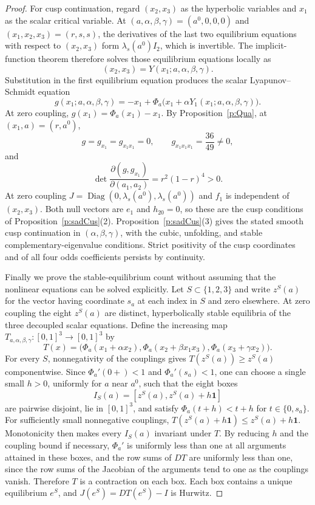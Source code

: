 \begin{proof}
For cusp continuation, regard $(x_2,x_3)$ as the
hyperbolic variables and $x_1$ as the scalar critical
variable. At $(a,\alpha,\beta,\gamma)=(a^0,0,0,0)$
and $(x_1,x_2,x_3)=(r,s,s)$, the derivatives of the last
two equilibrium equations with respect to $(x_2,x_3)$
form $\lambda_s(a^0)I_2$, which is invertible.
The implicit-function theorem therefore solves those
equilibrium equations locally as
\[
 (x_2,x_3)=Y(x_1;a,\alpha,\beta,\gamma).
\]
Substitution in the first equilibrium equation produces
the scalar Lyapunov--Schmidt equation
\[
 g(x_1;a,\alpha,\beta,\gamma)
 =-x_1+\Phi_a\bigl(x_1+\alpha Y_1(x_1;a,\alpha,\beta,\gamma)\bigr).
\]
At zero coupling, $g(x_1)=\Phi_a(x_1)-x_1$. By
Proposition~\ref{p:Qua}, at $(x_1,a)=(r,a^0)$,
\[
 g=g_{x_1}=g_{x_1x_1}=0,\qquad
 g_{x_1x_1x_1}=\frac{36}{49}\ne0,
\]
and
\[
 \det\frac{\partial(g,g_{x_1})}{\partial(a_1,a_2)}
 =r^2(1-r)^4>0.
\]
At zero coupling $J=\operatorname{Diag}(0,\lambda_s(a^0),\lambda_s(a^0))$ and $f_1$ is independent of
$(x_2,x_3)$. Both null vectors are $e_1$ and $h_{20}=0$, so these are the cusp conditions of
Proposition~\ref{p:sadCus}(2). Proposition~\ref{p:sadCus}(3) gives the stated smooth cusp
continuation in $(\alpha,\beta,\gamma)$, with the cubic, unfolding, and stable
complementary-eigenvalue conditions. Strict positivity of the cusp coordinates and of
all four odds coefficients persists by continuity.

Finally we prove the stable-equilibrium count without
assuming that the nonlinear equations can be solved
explicitly. Let $S\subset\{1,2,3\}$ and write $z^S(a)$ for
the vector having coordinate $s_a$ at each index in $S$
and zero elsewhere. At zero coupling the eight $z^S(a)$
are distinct, hyperbolically stable equilibria of the
three decoupled scalar equations. Define the increasing
map $T_{a,\alpha,\beta,\gamma}:[0,1]^3\to[0,1]^3$ by
\[
 T(x)=\bigl(\Phi_a(x_1+\alpha x_2),
             \Phi_a(x_2+\beta x_1x_3),
             \Phi_a(x_3+\gamma x_2)\bigr).
\]
For every $S$, nonnegativity of the couplings gives
$T(z^S(a))\ge z^S(a)$ componentwise.
Since $\Phi_a'(0+)<1$ and $\Phi_a'(s_a)<1$, one can choose a
single small $h>0$, uniformly for $a$ near $a^0$, such
that the eight boxes
\[
 I_S(a)=[z^S(a),z^S(a)+h\mathbf1]
\]
are pairwise disjoint, lie in $[0,1]^3$, and satisfy
$\Phi_a(t+h)<t+h$ for $t\in\{0,s_a\}$.
For sufficiently small nonnegative couplings,
$T(z^S(a)+h\mathbf1)\le z^S(a)+h\mathbf1$.
Monotonicity then makes every $I_S(a)$ invariant under
$T$. By reducing $h$ and the coupling bound if necessary,
$\Phi_a'$ is uniformly less than one at all arguments attained
in these boxes, and the row sums of $D T$ are uniformly
less than one, since the row sums of the Jacobian of the arguments tend to one as
the couplings vanish. Therefore $T$ is a contraction on
each box. Each box contains a unique equilibrium
$e^S$, and $J(e^S)=DT(e^S)-I$ is Hurwitz.


\end{proof}
